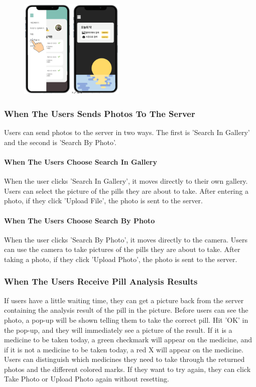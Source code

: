 \documentclass[conference]{IEEEtran}
\begin{document}
\begin{figure}[h!]
\centering
\includegraphics[width=5cm]{final_image_folder/click_today.png}
\caption{}
\label{fig:map}
\end{figure}

\subsubsection{When The Users Sends Photos To The Server}
Users can send photos to the server in two ways. The first is 'Search In Gallery' and the second is 'Search By Photo'. \\

\paragraph{When The Users Choose Search In Gallery}
When the user clicks 'Search In Gallery', it moves directly to their own gallery. Users can select the picture of the pills they are about to take. After entering a photo, if they click 'Upload File', the photo is sent to the server.

\paragraph{When The Users Choose Search By Photo}
When the user clicks 'Search By Photo', it moves directly to the camera. Users can use the camera to take pictures of the pills they are about to take. After taking a photo, if they click 'Upload Photo', the photo is sent to the server.\\

\subsubsection{When The Users Receive Pill Analysis Results}
If users have a little waiting time, they can get a picture back from the server containing the analysis result of the pill in the picture. Before users can see the photo, a pop-up will be shown telling them to take the correct pill. Hit 'OK' in the pop-up, and they will immediately see a picture of the result. If it is a medicine to be taken today, a green checkmark will appear on the medicine, and if it is not a medicine to be taken today, a red X will appear on the medicine. Users can distinguish which medicines they need to take through the returned photos and the different colored marks. If they want to try again, they can click Take Photo or Upload Photo again without resetting.\\
\end{document}
